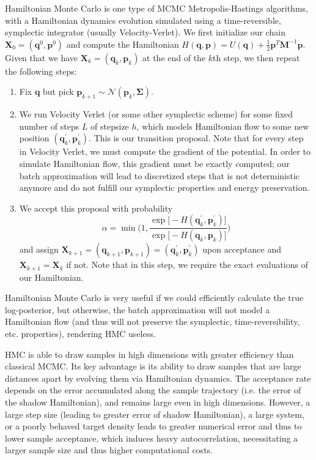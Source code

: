     Hamiltonian Monte Carlo is one type of MCMC Metropolis-Hastings algorithms, with a Hamiltonian dynamics evolution simulated using a time-reversible, symplectic integrator (usually Velocity-Verlet). We first initialize our chain $\mathbf{X}_0 = (\mathbf{q}^0, \mathbf{p}^0)$ and compute the Hamiltonian $H(\mathbf{q}, \mathbf{p}) = U(\mathbf{q}) + \frac{1}{2} \mathbf{p}^T \mathbf{M}^{-1} \mathbf{p}$. Given that we have $\mathbf{X}_k = (\mathbf{q}_k, \mathbf{p}_k)$ at the end of the $k$th step, we then repeat the following steps: 
    \begin{enumerate}
        \item Fix $\mathbf{q}$ but pick $\mathbf{p}_{k+1} \sim \mathcal{N}(\mathbf{p}_k, \mathbf{\Sigma})$. 
        \item We run Velocity Verlet (or some other symplectic scheme) for some fixed number of steps $L$ of stepsize $h$, which models Hamiltonian flow to some new position $(\mathbf{q}_k^\prime, \mathbf{p}_k^\prime)$. This is our transition proposal. Note that for every step in Velocity Verlet, we must compute the gradient of the potential. In order to simulate Hamiltonian flow, this gradient must be exactly computed; our batch approximation will lead to discretized steps that is not deterministic anymore and do not fulfill our symplectic properties and energy preservation. 
        \item We accept this proposal with probability 
        \[\alpha = \min \bigg( 1, \frac{\exp \big[ -H(\mathbf{q}_k^\prime, \mathbf{p}_k^\prime) \big]}{\exp \big[ -H(\mathbf{q}_k, \mathbf{p}_k)\big]} \bigg)\]
        and assign $\mathbf{X}_{k+1} = (\mathbf{q}_{k+1}, \mathbf{p}_{k+1}) = (\mathbf{q}_k^\prime, \mathbf{p}_k^\prime)$ upon acceptance and $\mathbf{X}_{k+1} = \mathbf{X}_k$ if not. Note that in this step, we require the exact evaluations of our Hamiltonian. 
    \end{enumerate}
    Hamiltonian Monte Carlo is very useful if we could efficiently calculate the true log-posterior, but otherwise, the batch approximation will not model a Hamiltonian flow (and thus will not preserve the symplectic, time-reversibility, etc. properties), rendering HMC useless. 

    HMC is able to draw samples in high dimensions with greater efficiency than classical MCMC. Its key advantage is its ability to draw samples that are large distances apart by evolving them via Hamiltonian dynamics. The acceptance rate depends on the error accumulated along the sample trajectory (i.e. the error of the shadow Hamiltonian), and remains large even in high dimensions. However, a large step size (leading to greater error of shadow Hamiltonian), a large system, or a poorly behaved target density leads to greater numerical error and thus to lower sample acceptance, which induces heavy autocorrelation, necessitating a larger sample size and thus higher computational costs. 

